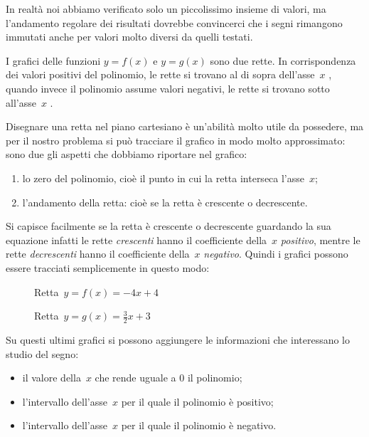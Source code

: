 In realtà noi abbiamo verificato solo un piccolissimo insieme di valori, 
ma l'andamento regolare dei risultati dovrebbe convincerci che i segni 
rimangono immutati anche per valori molto diversi da quelli testati.

I grafici delle funzioni \(y=f(x)\) e \(y=g(x)\) sono due rette. 
In corrispondenza dei valori positivi del polinomio, le rette si trovano al 
di sopra dell'asse~\(x\)%
, quando invece il polinomio assume valori negativi, le rette si trovano 
sotto all'asse~\(x\)%
.

Disegnare una retta nel piano cartesiano è un'abilità molto utile da 
possedere, ma per il nostro problema si può tracciare il grafico in modo 
molto approssimato: sono due gli aspetti che dobbiamo riportare nel grafico:

\begin{enumerate} [noitemsep]
 \item 
  lo zero del polinomio, cioè il punto in cui la retta interseca 
  l'asse~\(x\);
 \item
  l'andamento della retta: cioè se la retta è crescente o decrescente.
\end{enumerate}

Si capisce facilmente se la retta è crescente o decrescente guardando la sua 
equazione infatti le rette \emph{crescenti} hanno il coefficiente della~\(x\) 
\emph{positivo}, mentre le rette \emph{decrescenti} hanno il coefficiente 
della~\(x\) \emph{negativo}.
Quindi i grafici possono essere tracciati semplicemente in questo modo:

\begin{inaccessibleblock}
 \begin{figure}[h]
 \centering
 \begin{minipage}[]{.45\textwidth}
  \centering{}
  \caption{Retta~\(y = f(x) = -4 x +4\)}
 \end{minipage}
 \begin{minipage}[]{.45\textwidth}
  \centering{}
  \caption{Retta~\(y = g(x) = \frac{3}{2} x +3\)}
 \end{minipage}
\end{figure}
\end{inaccessibleblock}

Su questi ultimi grafici si possono aggiungere le informazioni che 
interessano lo studio del segno:

\begin{itemize} [noitemsep]
 \item il valore della~\(x\) che rende uguale a 0 il polinomio;
 \item l'intervallo dell'asse~\(x\) per il quale il polinomio è positivo;
 \item l'intervallo dell'asse~\(x\) per il quale il polinomio è negativo.
\end{itemize}

